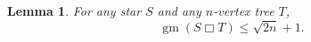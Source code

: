 \documentclass{patmorin}
\newcommand{\boxprod}{\mathbin{\Box}}
\renewcommand{\ge}{\geqslant}
\renewcommand{\le}{\leqslant}
\DeclareMathOperator{\gm}{gm}
\theoremstyle{plain}
\newtheorem{lem}[thm]{Lemma}
\theoremstyle{definition}
\begin{document}

 




\begin{lem}\label{star_times_tree_cartesian}
  For any star $S$ and any $n$-vertex tree $T$, 
  $$\gm(S\boxprod T)\le \sqrt{2n}+1.$$
\end{lem}
\end{document}
